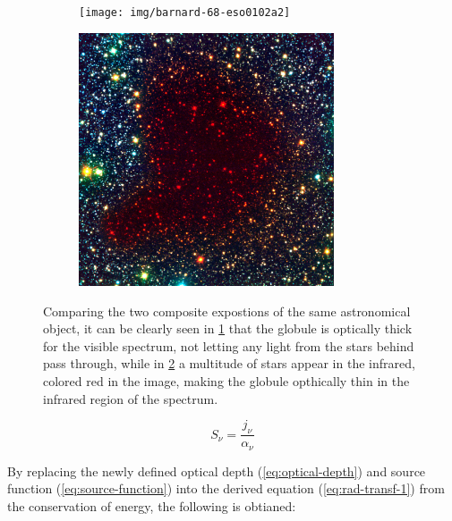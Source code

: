 \begin{figure}[ht]
	\begin{subfigure}[t]{0.47\textwidth}
		\texttt{[image: img/barnard-68-eso0102a2]}
		\label{fig:barnard68-vis}
	\end{subfigure}\hfill%
	\begin{subfigure}[t]{0.47\textwidth}
		\includegraphics[height=7.5cm]{img/barnard-68-ir-eso0102b}
		\label{fig:barnard68-ir}
	\end{subfigure}%
\caption{Comparing the two composite expostions of the same astronomical object, it can be clearly seen in \ref{fig:barnard68-vis} that the globule is optically thick for the visible spectrum, not letting any light from the stars behind pass through, while in \ref{fig:barnard68-ir} a multitude of stars appear in the infrared, colored red in the image, making the globule opthically thin in the infrared region of the spectrum.}
\label{fig:barnard68}
\end{figure}

\begin{equation}\label{eq:source-function}
	S_{\nu} = \frac{j_{\nu}}{\alpha_{\nu}}
\end{equation}

By replacing the newly defined optical depth (\ref{eq:optical-depth}) and source function (\ref{eq:source-function}) into the derived equation (\ref{eq:rad-transf-1}) from the conservation of energy, the following is obtianed:

